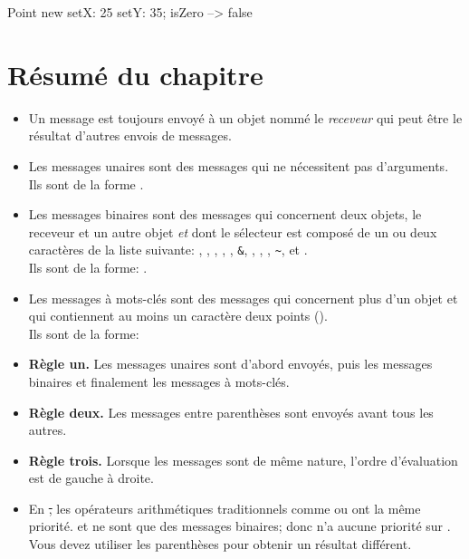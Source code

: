 \documentclass[a4paper,10pt,twoside]{book}
\begin{document}
\begin{code}{}
Point new setX: 25 setY: 35; isZero --> false
\end{code}
\section{Résumé du chapitre}

\begin{itemize}
\item Un message est toujours envoyé à un objet nommé le \emph{receveur} qui peut être le résultat d'autres envois de messages.

\item Les messages unaires sont des messages qui ne nécessitent pas d'arguments. Ils sont de la forme .

\item Les messages binaires sont des messages qui concernent deux objets, le receveur et un autre objet \emph{et} dont le sélecteur est composé de un ou deux caractères de la liste suivante: \ct{+}, \ct{-}, \ct{*}, \ct{/}, \ct{|}, \texttt{\&}, \ct{=}, \ct{>}, \ct{<}, \texttt{\~}, et .\\
Ils sont de la forme: .

\item Les messages à mots-clés sont des messages qui concernent plus d'un objet et qui contiennent au moins un caractère deux points (\ct{:}).\\
Ils sont de la forme: 


\item \textbf{Règle un.} Les messages unaires sont d'abord envoyés, puis les messages binaires et finalement les messages à mots-clés.

\item \textbf{Règle deux.} Les messages entre parenthèses sont envoyés avant tous les autres.

\item \textbf{Règle trois.} Lorsque les messages sont de même nature, l'ordre d'évaluation est de gauche à droite.

\item En \st, les opérateurs arithmétiques traditionnels comme \ct{+}
  ou \ct{*} ont la même priorité. \ct{+} et \ct{*} ne sont que des
  messages binaires; donc \ct{*} n'a aucune priorité sur
  \ct{+}. Vous devez utiliser les parenthèses pour obtenir un
  résultat différent.
\end{itemize}

\ifx\wholebook\relax\else
\end{document}
